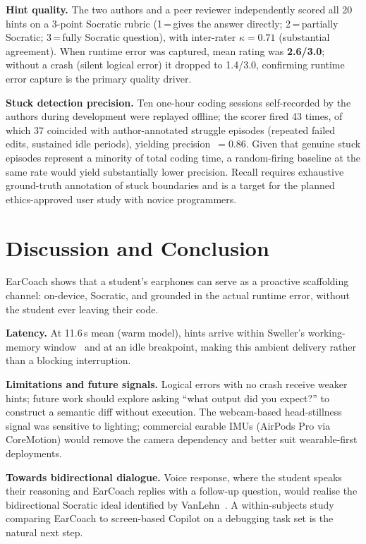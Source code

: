 \documentclass[sigconf,anonymous,review]{acmart}
\begin{document}
\textbf{Hint quality.} The two authors and a peer reviewer independently
scored all 20 hints on a 3-point Socratic rubric (1\,=\,gives the
answer directly; 2\,=\,partially Socratic; 3\,=\,fully Socratic
question), with inter-rater $\kappa\!=\!0.71$ (substantial agreement).
When runtime error was captured, mean rating was \textbf{2.6/3.0};
without a crash (silent logical error) it dropped to 1.4/3.0, confirming runtime error
capture is the primary quality driver.

\textbf{Stuck detection precision.} Ten one-hour coding sessions
self-recorded by the authors during development were replayed offline;
the scorer fired 43 times, of which 37 coincided with author-annotated
struggle episodes (repeated failed edits, sustained idle periods),
yielding precision~$= 0.86$. Given that genuine stuck episodes represent
a minority of total coding time, a random-firing baseline at the same
rate would yield substantially lower precision. Recall requires
exhaustive ground-truth annotation of stuck boundaries and is a target
for the planned ethics-approved user study with novice programmers.

\section{Discussion and Conclusion}

EarCoach shows that a student's earphones can serve as a proactive
scaffolding channel: on-device, Socratic, and grounded in the actual
runtime error, without the student ever leaving their code.

\textbf{Latency.} At 11.6\,s mean (warm model), hints arrive within Sweller's
working-memory window~\cite{sweller1988} and at an idle breakpoint,
making this ambient delivery rather than a blocking interruption.

\textbf{Limitations and future signals.} Logical errors with no crash
receive weaker hints; future work should explore asking ``what output
did you expect?'' to construct a semantic diff without execution. The
webcam-based head-stillness signal was sensitive to lighting; commercial
earable IMUs (AirPods Pro via CoreMotion) would remove the camera
dependency and better suit wearable-first deployments.

\textbf{Towards bidirectional dialogue.} Voice response, where the
student speaks their reasoning and EarCoach replies with a follow-up
question, would realise the bidirectional Socratic ideal identified by
VanLehn~\cite{vanlehn2011}. A within-subjects study comparing EarCoach
to screen-based Copilot on a debugging task set is the natural next step.
\end{document}
